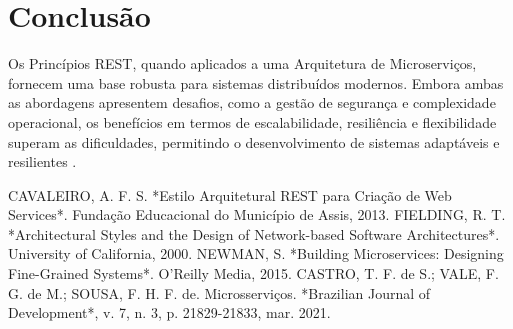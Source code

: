 \documentclass[12pt]{article}
\begin{document}
	\section{Conclusão}
	
	Os Princípios REST, quando aplicados a uma Arquitetura de Microserviços, fornecem uma base robusta para sistemas distribuídos modernos. Embora ambas as abordagens apresentem desafios, como a gestão de segurança e complexidade operacional, os benefícios em termos de escalabilidade, resiliência e flexibilidade superam as dificuldades, permitindo o desenvolvimento de sistemas adaptáveis e resilientes \cite{fielding2000}.
	
	
	\begin{thebibliography}{99}
		 CAVALEIRO, A. F. S. *Estilo Arquitetural REST para Criação de Web Services*. Fundação Educacional do Município de Assis, 2013.
		 FIELDING, R. T. *Architectural Styles and the Design of Network-based Software Architectures*. University of California, 2000.
		 NEWMAN, S. *Building Microservices: Designing Fine-Grained Systems*. O'Reilly Media, 2015.
		 CASTRO, T. F. de S.; VALE, F. G. de M.; SOUSA, F. H. F. de. Microsserviços. *Brazilian Journal of Development*, v. 7, n. 3, p. 21829-21833, mar. 2021.		
	\end{thebibliography}
	
\end{document}
